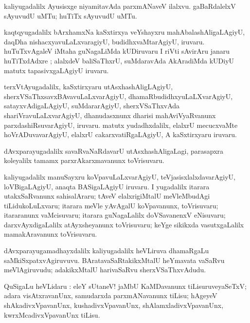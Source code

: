 \documentclass{article}
\begin{document}
\begin{mn}
kaliyugadalilx Ayusisxge niyamitavAda parxmANaveV ilalxvu. gaBaRdalelxV sAyuvudU uMTu;
huTiTx sAyuvudU uMTu.
\end{mn}

\begin{mn}
kaqtqyugadalilx bArxhamxNa kaSxtirxya veYshayxru mahAbalashAligaLAgiyU, 
daqDha nishacxyavuLaLxvaragiyU, budidhxvaMtarAgiyU, iruvaru. huTuTxvAgaleV iMtaha guNagaLiMda 
kUDiruvaru I riVti sAvirAru janaru huTiTxdAdxre ; alalxdeV baliSaThxrU, suMdaravAda 
AkAradiMda kUDiyU matutx tapasivxgaLAgiyU iruvaru.
\end{mn}

\begin{mn}
terxVtAyugadalilx, kaSxtirxyaru utAsxhashAligLAgiyU, sherxVSaThxsavxBAvavuLaLxvarAgiyU,
dhamaRbudidhxyuLaLXvarAgiyU, satayxvAdigaLAgiyU, suMdararAgiyU, 
sherxVSaThxvAda shariVravuLaLxvarAgiyU, dhanudasxnunx dharisi mahAviVyaRvanunx 
parxdashiRsuvarAgiyU, iruvaru. matutx yudadhxdalilx, elalxrU mecucxvaMte hoVrADuvavarAgiyU, 
elalxrU cakarxvatiRgaLAgiyU, A kaSxtirxyaru iruvaru.
\end{mn}

\begin{mn}
dAvxparayugadalilx savaRvaNaRdavarU utAsxhashAligaLagi, parasapxra 
koleyalilx tamamx parxrAkarxmavanunx toVrisuvaru.
\end{mn}

\begin{mn}
kaliyugadalilx manuSayxru koVpavuLaLxvarAgiyU, teVjasisxlalxdavarAgiyU, 
loVBigaLAgiyU, anaqta BASigaLAgiyU iruvaru. I yugadalilx itarara utakxSaRvanunx sahisalAraru;
tAveV elalxrigiMtalU meVleMbudAgi tiLidukoLuLxvaru; 
itarara meVle  yAvAgalU koVpavanunx, toVrisuvaru; itararanunx vaMcisuvaru; itarara guNagaLalilx
doVSavanenxV eNisuvaru; darxvAyxdigaLalilx atAyxsheyanunx toVrisuvaru; keYge 
sikikxda vasutxgaLalilx mamakAravanunx toVrisuvaru.
\end{mn}

\begin{mn}
dAvxparayugamadhayxdalilx kaliyugadalilx heVLiruva dhamaRgaLu saMkiSxpatxvAgiruvuvu. 
BAratavaSaRtakikxMtalU heYmavata vaSaRvu meVlAgiruvudu; 
adakikxMtalU harivaSaRvu sherxVSaThxvAdudu.
\end{mn}


\begin{mn}
QuSigaLu heVLidaru : eleY sUtaneV! jaMbU KaMDavanunx tiLisuruveyaSeTxV; 
adara visAtxravanUnx, samudarxda parxmANavanunx tiLisu; hAgeyeV shAkadivxVpavanUnx,
kushadivxVpavanUnx, shAlamxladivxVpavanUnx, kwrxMcadivxVpavanUnx tiLisu.
\end{mn}
\end{document}
